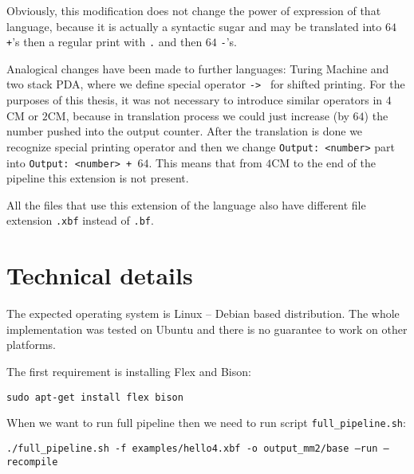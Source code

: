 \documentclass[english,shortabstract,mgr]{iithesis}
\begin{document}
Obviously, this modification does not change the power of expression
of that language, because it is actually a syntactic sugar and may be translated
into $64$ \texttt{+}'s then a regular print with \texttt{.} and then $64$ \texttt{-}'s.

Analogical changes have been made to further languages: Turing Machine and two
stack PDA, where we define special operator \texttt{->~} for shifted printing.
For the purposes of this thesis, it was not necessary to introduce similar
operators in $4$CM or $2$CM, because in translation process we could just
increase (by $64$) the number pushed into the output counter. After the translation
is done we recognize special printing operator and then we change \texttt{Output: <number>}
part into \texttt{Output:~<number>~+~$64$}. This means that from $4$CM
to the end of the pipeline this extension is not present.

All the files that use this extension of the language also have different file
extension \texttt{.xbf} instead of \texttt{.bf}.

\section{Technical details}

The expected operating system is Linux -- Debian based distribution. The whole implementation
was tested on Ubuntu and there is no guarantee to work on other platforms.

The first requirement is installing Flex and Bison:

\texttt{sudo apt-get install flex bison}

When we want to run full pipeline then we need to run script \texttt{full\_pipeline.sh}:

\hspace{-1.25cm}
\texttt{./full\_pipeline.sh -f examples/hello4.xbf -o output\_mm2/base --run --recompile}
\end{document}
